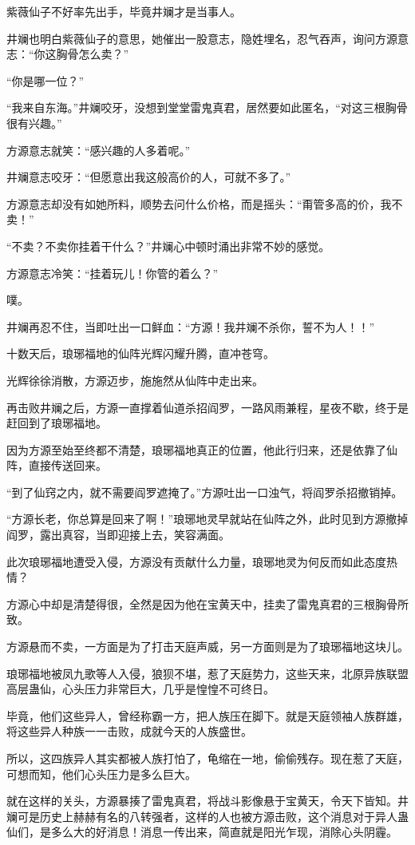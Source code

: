\begin{this_body}
紫薇仙子不好率先出手，毕竟井斓才是当事人。

井斓也明白紫薇仙子的意思，她催出一股意志，隐姓埋名，忍气吞声，询问方源意志：“你这胸骨怎么卖？”

“你是哪一位？”

“我来自东海。”井斓咬牙，没想到堂堂雷鬼真君，居然要如此匿名，“对这三根胸骨很有兴趣。”

方源意志就笑：“感兴趣的人多着呢。”

井斓意志咬牙：“但愿意出我这般高价的人，可就不多了。”

方源意志却没有如她所料，顺势去问什么价格，而是摇头：“甭管多高的价，我不卖！”

“不卖？不卖你挂着干什么？”井斓心中顿时涌出非常不妙的感觉。

方源意志冷笑：“挂着玩儿！你管的着么？”

噗。

井斓再忍不住，当即吐出一口鲜血：“方源！我井斓不杀你，誓不为人！！”

十数天后，琅琊福地的仙阵光辉闪耀升腾，直冲苍穹。

光辉徐徐消散，方源迈步，施施然从仙阵中走出来。

再击败井斓之后，方源一直撑着仙道杀招阎罗，一路风雨兼程，星夜不歇，终于是赶回到了琅琊福地。

因为方源至始至终都不清楚，琅琊福地真正的位置，他此行归来，还是依靠了仙阵，直接传送回来。

“到了仙窍之内，就不需要阎罗遮掩了。”方源吐出一口浊气，将阎罗杀招撤销掉。

“方源长老，你总算是回来了啊！”琅琊地灵早就站在仙阵之外，此时见到方源撤掉阎罗，露出真容，当即迎接上去，笑容满面。

此次琅琊福地遭受入侵，方源没有贡献什么力量，琅琊地灵为何反而如此态度热情？

方源心中却是清楚得很，全然是因为他在宝黄天中，挂卖了雷鬼真君的三根胸骨所致。

方源悬而不卖，一方面是为了打击天庭声威，另一方面则是为了琅琊福地这块儿。

琅琊福地被凤九歌等人入侵，狼狈不堪，惹了天庭势力，这些天来，北原异族联盟高层蛊仙，心头压力非常巨大，几乎是惶惶不可终日。

毕竟，他们这些异人，曾经称霸一方，把人族压在脚下。就是天庭领袖人族群雄，将这些异人种族一一击败，成就今天的人族盛世。

所以，这四族异人其实都被人族打怕了，龟缩在一地，偷偷残存。现在惹了天庭，可想而知，他们心头压力是多么巨大。

就在这样的关头，方源暴揍了雷鬼真君，将战斗影像悬于宝黄天，令天下皆知。井斓可是历史上赫赫有名的八转强者，这样的人也被方源击败，这个消息对于异人蛊仙们，是多么大的好消息！消息一传出来，简直就是阳光乍现，消除心头阴霾。


\end{this_body}
